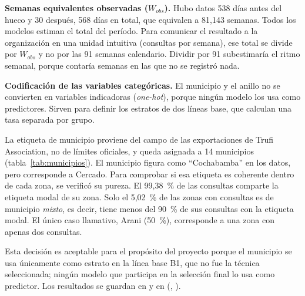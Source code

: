 \textbf{Semanas equivalentes observadas ($W_{obs}$).} Hubo datos 538 días antes del hueco
y 30 después, 568 días en total, que equivalen a 81,143 semanas. Todos los modelos estiman
el total del período. Para comunicar el resultado a la organización en una unidad
intuitiva (consultas por semana), ese total se divide por $W_{obs}$ y no por las 91
semanas calendario. Dividir por 91 subestimaría el ritmo semanal, porque contaría semanas
en las que no se registró nada.

\textbf{Codificación de las variables categóricas.} El municipio y el anillo no se
convierten en variables indicadoras (\emph{one-hot}), porque ningún modelo los usa como
predictores. Sirven para definir los estratos de dos líneas base, que calculan una tasa
separada por grupo.

La etiqueta de municipio proviene del campo  de las exportaciones de
Trufi Association, no de límites oficiales, y queda asignada a 14 municipios
(tabla~\ref{tab:municipios}). El municipio figura como ``Cochabamba'' en los datos, pero
corresponde a Cercado. Para comprobar si esa etiqueta es coherente dentro de cada zona, se
verificó su pureza. El 99,38~\% de las consultas comparte la etiqueta modal de su zona. Solo
el 5,02~\% de las zonas con consultas es de municipio \emph{mixto}, es decir, tiene menos
del 90~\% de sus consultas con la etiqueta modal. El único caso llamativo, Arani (50~\%),
corresponde a una zona con apenas dos consultas.

Esta decisión es aceptable para el propósito del proyecto porque el municipio se usa
únicamente como estrato en la línea base B1, que no fue la técnica seleccionada; ningún
modelo que participa en la selección final lo usa como predictor. Los resultados se
guardan en  y en
 (,
).

